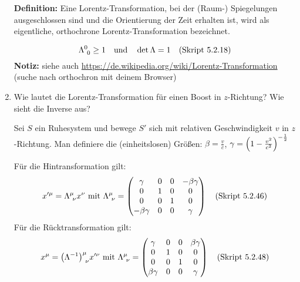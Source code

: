 \begin{enumerate}
    \textbf{Definition:} Eine Lorentz-Transformation, bei der (Raum-) 
    Spiegelungen 
    ausgeschlossen sind und die Orientierung der Zeit erhalten ist, 
    wird als eigentliche, orthochrone Lorentz-Transformation bezeichnet.

    \begin{equation*}
      \Lambda^{0}_{\ 0} \ge 1 
      \quad \text{und}\quad
      \det \Lambda = 1 \quad\text{(Skript 5.2.18)}
    \end{equation*}
    \textbf{Notiz:} siehe auch 
    \url{https://de.wikipedia.org/wiki/Lorentz-Transformation} (suche 
    nach orthochron mit deinem Browser)

  \item Wie lautet die Lorentz-Transformation für einen Boost in %
    $z$-Richtung? Wie sieht die Inverse aus?
    
    Sei $S$ ein Ruhesystem und bewege $S'$ sich mit relativen 
    Geschwindigkeit $v$ in $z$-Richtung. Man definiere die (einheitslosen)
    Größen:
    $\beta = \frac{v}{c}$, $\gamma=\qty(1-\frac{v^2}{c^2})^{-\frac{1}{2}}$
    
    Für die Hintransformation gilt:
    \begin{equation*}
      x'^\mu = \Lambda^\mu_{\ \nu} x^\nu 
      \text{ mit } 
      \Lambda^\mu_{\ \nu}=
      \begin{pmatrix}
        \gamma       & 0 & 0 & -\beta\gamma\\
        0            & 1 & 0 & 0           \\
        0            & 0 & 1 & 0           \\
        -\beta\gamma & 0 & 0 & \gamma      \\
      \end{pmatrix}
      \quad\text{(Skript 5.2.46)}
    \end{equation*}
    Für die Rücktransformation gilt:
    \begin{equation*}
      x^\mu = \qty(\Lambda^{-1})^\mu_{\ \nu} x'^\nu 
      \text{ mit } 
      \Lambda^\mu_{\ \nu}=
      \begin{pmatrix}
        \gamma       & 0 & 0 & \beta\gamma\\
        0            & 1 & 0 & 0           \\
        0            & 0 & 1 & 0           \\
        \beta\gamma  & 0 & 0 & \gamma      \\
      \end{pmatrix}
      \quad\text{(Skript 5.2.48)}
    \end{equation*}


\end{enumerate}
